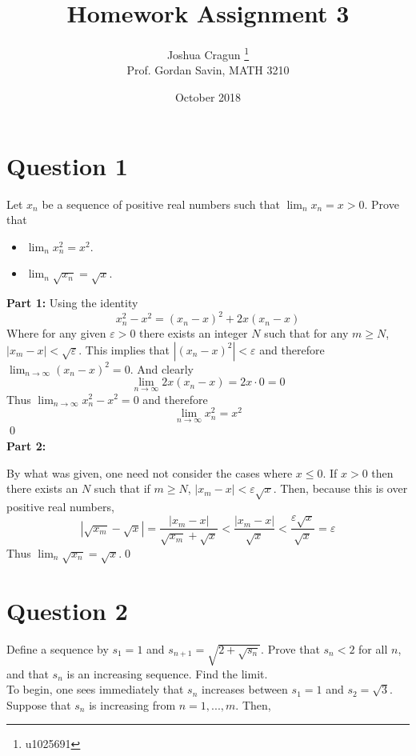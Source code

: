 \documentclass[12pt, letterpaper]{article}
\title{Homework Assignment 3}
\author{Joshua Cragun \thanks{u1025691} \\ Prof. Gordan Savin, MATH 3210}
\date{October 2018}
\begin{document}
\begin{titlepage}
\maketitle
\end{titlepage}

\pagebreak

\section*{Question 1}
Let $x_n$ be a sequence of positive real numbers such that $\lim_n x_n =x>0$. Prove that
\begin{itemize}
\item
$\lim_n x_n^2= x^2$.
\item
$\lim_n \sqrt{x_n}= \sqrt{x}$.
\end{itemize}

\noindent\textbf{Part 1:} Using the identity
$$ x_n^2 - x^2 = (x_n - x)^2 + 2x(x_n - x) $$
Where for any given $\varepsilon > 0$ there exists an integer $N$ such that for any $m \geq N$, $|x_m - x| < \sqrt{\varepsilon}$.
This implies that $|(x_n - x)^2| < \varepsilon$ and therefore $\lim_{n\to\infty} (x_n - x)^2 = 0$. And clearly
$$\lim_{n\to\infty} 2x(x_n - x) = 2x \cdot 0 = 0$$
Thus $\lim_{n\to\infty} x_n^2 - x^2 = 0$ and therefore
$$ \lim_{n\to\infty} x_n^2 = x^2 $$
\qed
\\
\noindent\textbf{Part 2:}

\noindent By what was given, one need not consider the cases where $x \leq 0$. If $x > 0$ then there exists an $N$ such that if $m \geq N$, $|x_m - x| < \varepsilon\sqrt{x}$. Then, because this is over positive real numbers,
$$ |\sqrt{x_m} - \sqrt{x}| = \frac{|x_m - x|}{\sqrt{x_m} + \sqrt{x}} < \frac{|x_m - x|}{\sqrt{x}} < \frac{\varepsilon\sqrt{x}}{\sqrt{x}} = \varepsilon $$
Thus $\lim_n \sqrt{x_n}= \sqrt{x}$.\qed

\pagebreak

\section*{Question 2}
Define a sequence by $s_1=1$ and $s_{n+1} = \sqrt{2+\sqrt{s_n}}$. Prove that $s_n <2$ for all $n$, and that $s_n$ is an increasing sequence. Find the limit.\\

\noindent To begin, one sees immediately that $s_n$ increases between $s_1 = 1$ and $s_2 = \sqrt{3}$. Suppose that $s_n$ is increasing from $n = 1, ..., m$. Then,
\end{document}
